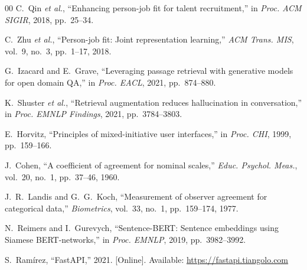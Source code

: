 \documentclass[conference]{IEEEtran}
\begin{document}
\begin{thebibliography}{00}
C.~Qin \textit{et al.}, ``Enhancing person-job fit for talent recruitment,'' in \textit{Proc. ACM SIGIR}, 2018, pp.~25--34.

C.~Zhu \textit{et al.}, ``Person-job fit: Joint representation learning,'' \textit{ACM Trans. MIS}, vol.~9, no.~3, pp.~1--17, 2018.

G.~Izacard and E.~Grave, ``Leveraging passage retrieval with generative models for open domain QA,'' in \textit{Proc. EACL}, 2021, pp.~874--880.

K.~Shuster \textit{et al.}, ``Retrieval augmentation reduces hallucination in conversation,'' in \textit{Proc. EMNLP Findings}, 2021, pp.~3784--3803.

E.~Horvitz, ``Principles of mixed-initiative user interfaces,'' in \textit{Proc. CHI}, 1999, pp.~159--166.

J.~Cohen, ``A coefficient of agreement for nominal scales,'' \textit{Educ. Psychol. Meas.}, vol.~20, no.~1, pp.~37--46, 1960.

J.~R.~Landis and G.~G.~Koch, ``Measurement of observer agreement for categorical data,'' \textit{Biometrics}, vol.~33, no.~1, pp.~159--174, 1977.

N.~Reimers and I.~Gurevych, ``Sentence-BERT: Sentence embeddings using Siamese BERT-networks,'' in \textit{Proc. EMNLP}, 2019, pp.~3982--3992.

S.~Ram\'irez, ``FastAPI,'' 2021. [Online]. Available: \url{https://fastapi.tiangolo.com}

\end{thebibliography}
\end{document}
